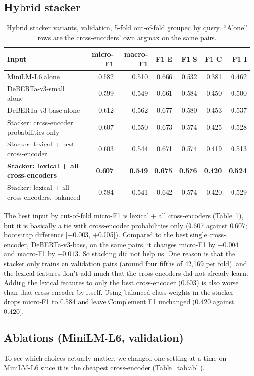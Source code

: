 \documentclass[11pt]{article}
\begin{document}
\subsection{Hybrid stacker}
\begin{table}[H]\centering\small
\begin{tabular}{lrrrrrr}\toprule
Input & micro-F1 & macro-F1 & F1 E & F1 S & F1 C & F1 I \\\midrule
MiniLM-L6 alone & 0.582 & 0.510 & 0.666 & 0.532 & 0.381 & 0.462 \\
DeBERTa-v3-small alone & 0.599 & 0.549 & 0.661 & 0.584 & 0.450 & 0.500 \\
DeBERTa-v3-base alone & 0.612 & 0.562 & 0.677 & 0.580 & 0.453 & 0.537 \\
Stacker: cross-encoder probabilities only & 0.607 & 0.550 & 0.673 & 0.574 & 0.425 & 0.528 \\
Stacker: lexical + best cross-encoder & 0.603 & 0.544 & 0.671 & 0.574 & 0.419 & 0.513 \\
\textbf{Stacker: lexical + all cross-encoders} & \textbf{0.607} & \textbf{0.549} & \textbf{0.675} & \textbf{0.576} & \textbf{0.420} & \textbf{0.524} \\
Stacker: lexical + all cross-encoders, balanced & 0.584 & 0.541 & 0.642 & 0.574 & 0.420 & 0.529 \\
\bottomrule\end{tabular}
\caption{Hybrid stacker variants, validation, 5-fold out-of-fold grouped by query. ``Alone'' rows are the cross-encoders' own argmax on the same pairs.}\label{tab:hybrid}
\end{table}

The best input by out-of-fold micro-F1 is lexical + all cross-encoders (Table~\ref{tab:hybrid}), but it is basically a tie with cross-encoder probabilities only (0.607 against 0.607; bootstrap difference [$-$0.003, +0.005]). Compared to the best single cross-encoder, DeBERTa-v3-base, on the same pairs, it changes micro-F1 by $-0.004$ and macro-F1 by $-0.013$.
So stacking did not help us. One reason is that the stacker only trains on validation pairs (around four fifths of 42{,}169 per fold), and the lexical features don't add much that the cross-encoders did not already learn. Adding the lexical features to only the best cross-encoder (0.603) is also worse than that cross-encoder by itself.
Using balanced class weights in the stacker drops micro-F1 to 0.584 and leave Complement F1 unchanged (0.420 against 0.420).

\subsection{Ablations (MiniLM-L6, validation)}
To see which choices actually matter, we changed one setting at a time on MiniLM-L6 since it is the cheapest cross-encoder (Table~\ref{tab:abl}).
\end{document}
